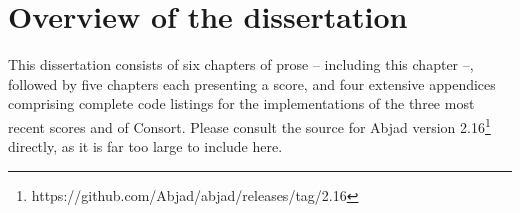 %
%
%
%
%
\section{Overview of the dissertation}
\label{sec:overview-of-the-dissertation}

This dissertation consists of six chapters of prose -- including this chapter
--, followed by five chapters each presenting a score, and four extensive
appendices comprising complete code listings for the implementations of the
three most recent scores and of Consort. Please consult the source for Abjad
version 2.16\footnote{https://github.com/Abjad/abjad/releases/tag/2.16}
directly, as it is far too large to include here.

